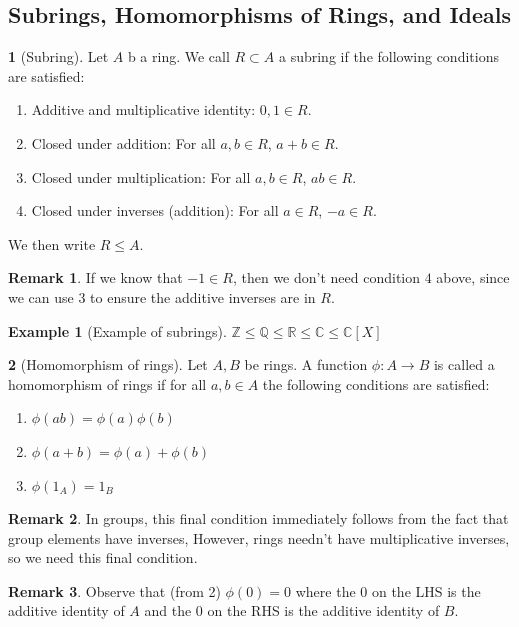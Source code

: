 \documentclass[12pt]{article}
\theoremstyle{definition}
\newtheorem{definition}{\color{NavyBlue}{\textbf{Definition}}}
\newcommand{\R}{\mathbb{R}}
\newcommand{\Z}{\mathbb{Z}}
\newtheorem{example}{\color{WildStrawberry}Example}
\newtheorem{remark}{Remark}
\theoremstyle{definition}
\begin{document}
\subsection{Subrings, Homomorphisms of Rings, and Ideals}
\begin{definition}[Subring]
	Let $A$ b a ring. We call $R \subset A$ a subring if the following conditions are satisfied:
	\begin{enumerate}
		\item Additive and multiplicative identity: $0,1 \in R$.
		\item Closed under addition: For all $a,b \in R$, $a+b \in R$.
		\item Closed under multiplication: For all $a,b \in R$, $ab \in R$.
		\item Closed under inverses (addition): For all $a \in R$, $-a \in R$. 
	\end{enumerate}
	We then write $R \leq A$.
\end{definition}

\begin{remark}
	If we know that $-1 \in R$, then we don't need condition $4$ above, since we can use $3$ to ensure the additive inverses are in $R$.
\end{remark}

\begin{example}[Example of subrings]
	$\Z \leq \mathbb{Q} \leq \R \leq \mathbb{C} \leq \mathbb{C}[X]$
\end{example}

\begin{definition}[Homomorphism of rings]
	Let $A,B$ be rings. A function $\phi: A \to B$ is called a homomorphism of rings if for all $a,b \in A$ the following conditions are satisfied:
	\begin{enumerate}
		\item $\phi(ab) = \phi(a)\phi(b)$
		\item $\phi(a+b) = \phi(a) + \phi(b)$
		\item $\phi(1_A) = 1_B$
	\end{enumerate}
\end{definition}

\begin{remark}
	In groups, this final condition immediately follows from the fact that group elements have inverses, However, rings needn't have multiplicative inverses, so we need this final condition.
\end{remark}
\begin{remark}
	Observe that (from 2) $\phi(0) = 0$ where the $0$ on the LHS is the additive identity of $A$ and the $0$ on the RHS is the additive identity of $B$. 
\end{remark}
\end{document}
